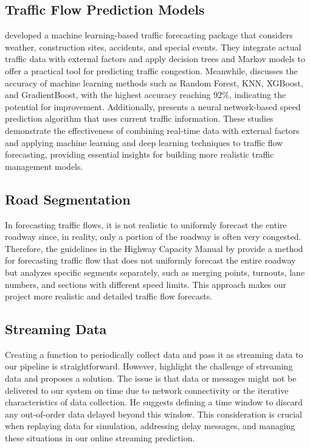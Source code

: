 \subsection{Traffic Flow Prediction Models}
 \citet{garrett2020integrated} developed a machine learning-based traffic forecasting package that considers weather, construction sites, accidents, and special events. They integrate actual traffic data with external factors and apply decision trees and Markov models to offer a practical tool for predicting traffic congestion. Meanwhile, \citet{zafar2020traffic} discusses the accuracy of machine learning methods such as Random Forest, KNN, XGBoost, and GradientBoost, with the highest accuracy reaching 92\%, indicating the potential for improvement. Additionally, \citet{park2011real} presents a neural network-based speed prediction algorithm that uses current traffic information. These studies demonstrate the effectiveness of combining real-time data with external factors and applying machine learning and deep learning techniques to traffic flow forecasting, providing essential insights for building more realistic traffic management models.

\subsection{Road Segmentation}
 In forecasting traffic flows, it is not realistic to uniformly forecast the entire roadway since, in reality, only a portion of the roadway is often very congested. Therefore, the guidelines in the Highway Capacity Manual by \citet{bob2023freeway} provide a method for forecasting traffic flow that does not uniformly forecast the entire roadway but analyzes specific segments separately, such as merging points, turnouts, lane numbers, and sections with different speed limits. This approach makes our project more realistic and detailed traffic flow forecasts.

\subsection{Streaming Data}
 Creating a function to periodically collect data and pass it as streaming data to our pipeline is straightforward. However, \citet{damji2020learning} highlight the challenge of streaming data and proposes a solution. The issue is that data or messages might not be delivered to our system on time due to network connectivity or the iterative characteristics of data collection. He suggests defining a time window to discard any out-of-order data delayed beyond this window. This consideration is crucial when replaying data for simulation, addressing delay messages, and managing these situations in our online streaming prediction.

